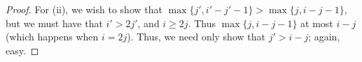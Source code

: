 \documentclass[11pt]{article}
\makeatletter
\newcommand{\produces}[3]{{#1}{#3}{#2}}
\renewcommand{\Q}{Q}
\newcommand{\minDim}{m}
\newcommand{\minDimP}{\overline{m}}
\renewcommand{\produces}[3]{
{
\def\labelstyle{\scriptstyle}
\xymatrix@C=2em@1{
{#1}
\ar@{-}[r]|-{{\,#3\,}}
&%
{#2}%
}}}
\makeatother
\begin{document}
\begin{SteenrodAlgebrasAndTheirKoszulDuals}
\begin{proof}
For (ii), we wish to show that $\max\{j',i'-j'-1\}>\max\{j,i-j-1\}$, but we must have that $i'> 2j'$, and $i\geq2j$. Thus $\max\{j,i-j-1\}$ at most $i-j$ (which happens when $i=2j$). Thus, we need only show that $j'>i-j$; again, easy.
\end{proof}
%
%



\end{SteenrodAlgebrasAndTheirKoszulDuals}
\end{document}
